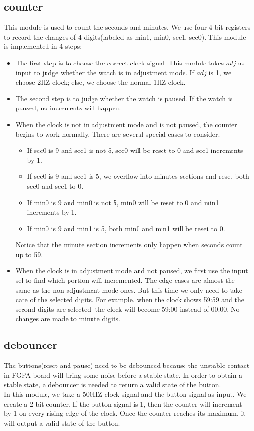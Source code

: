 \documentclass[12pt]{article}
\begin{document}
\subsection*{counter}
This module is used to count the seconds and minutes. We use four 4-bit registers to record the changes of 4 digits(labeled as min1, min0, sec1, sec0). This module is implemented in 4 steps:
\begin{itemize}
\item The first step is to choose the correct clock signal. This module takes $adj$ as input to judge whether the watch is in adjustment mode. If $adj$ is 1, we choose 2HZ clock; else, we choose the normal 1HZ clock. 
\item The second step is to judge whether the watch is paused. If the watch is paused, no increments will happen.
\item When the clock is not in adjustment mode and is not paused, the counter begins to work normally. There are several special cases to consider. 
\begin{itemize}
\item If sec0 is 9 and sec1 is not 5, sec0 will be reset to 0 and sec1 increments by 1. 
\item If sec0 is 9 and sec1 is 5, we overflow into minutes sections and reset both sec0 and sec1 to 0. 
\item If min0 is 9 and min0 is not 5, min0 will be reset to 0 and min1 increments by 1. 
\item If min0 is 9 and min1 is 5, both min0 and min1 will be reset to 0.
\end{itemize}
Notice that the minute section increments only happen when seconds count up to 59. 
\item When the clock is in adjustment mode and not paused, we first use the input sel to find which portion will incremented. The edge cases are almost the same as the non-adjustment-mode ones. But this time we only need to take care of the selected digits. For example, when the clock shows 59:59 and the second digits are selected, the clock will become 59:00 instead of 00:00. No changes are made to minute digits.  

\end{itemize}

\subsection*{debouncer}
The buttons(reset and pause) need to be debounced because the unstable contact in FGPA board will bring some noise before a stable state. In order to obtain a stable state, a debouncer is needed to return a valid state of the button. \\
In this module, we take a 500HZ clock signal and the button signal as input. We create a 2-bit counter. If the button signal is 1, then the counter will increment by 1 on every rising edge of the clock. Once the counter reaches its maximum, it will output a valid state of the button. 
\end{document}
